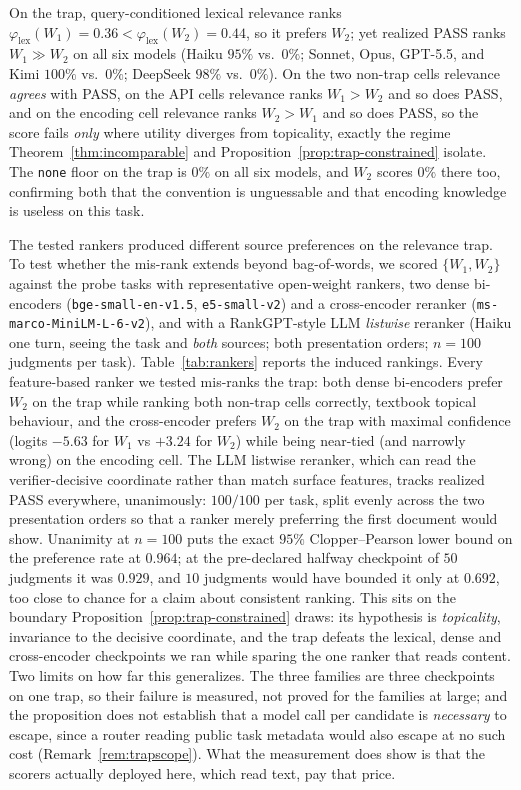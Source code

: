 \documentclass[11pt]{article}
\theoremstyle{plain}
\theoremstyle{definition}
\theoremstyle{remark}
\begin{document}
On the trap, query-conditioned lexical relevance ranks $\varphi_{\mathrm{lex}}(W_1) = 0.36 <
\varphi_{\mathrm{lex}}(W_2) = 0.44$, so it prefers $W_2$; yet realized PASS ranks $W_1 \gg W_2$ on all
six models (Haiku $95\%$ vs.\ $0\%$; Sonnet, Opus, GPT-5.5, and Kimi $100\%$ vs.\ $0\%$;
DeepSeek $98\%$ vs.\ $0\%$). On the two non-trap cells relevance \emph{agrees}
with PASS, on the API cells relevance ranks $W_1 > W_2$ and so does PASS, and on the encoding cell
relevance ranks $W_2 > W_1$ and so does PASS, so the score fails \emph{only} where utility diverges
from topicality, exactly the regime Theorem~\ref{thm:incomparable} and
Proposition~\ref{prop:trap-constrained} isolate. The \texttt{none} floor on the trap is $0\%$ on
all six models, and $W_2$ scores $0\%$ there too, confirming both that the convention is
unguessable and that encoding knowledge is useless on this task.

The tested rankers produced different source preferences on the relevance trap. To test whether
the mis-rank extends beyond bag-of-words, we scored $\{W_1,W_2\}$ against the
probe tasks with representative open-weight rankers, two dense bi-encoders
(\texttt{bge-small-en-v1.5}, \texttt{e5-small-v2}) and a cross-encoder reranker
(\texttt{ms-marco-MiniLM-L-6-v2}), and with a RankGPT-style LLM \emph{listwise} reranker (Haiku
one turn, seeing the task and \emph{both} sources; both presentation orders; $n=100$ judgments
per task). Table~\ref{tab:rankers} reports the induced rankings. Every feature-based
ranker we tested mis-ranks the trap: both dense bi-encoders prefer $W_2$ on the trap while
ranking both non-trap cells correctly, textbook topical behaviour, and the cross-encoder prefers
$W_2$ on the trap with maximal confidence (logits $-5.63$ for $W_1$ vs $+3.24$ for $W_2$) while
being near-tied (and narrowly wrong) on the encoding cell. The LLM listwise reranker,
which can read the verifier-decisive coordinate rather than match surface features, tracks
realized PASS everywhere, unanimously: $100/100$ per task, split evenly across the two
presentation orders so that a ranker merely preferring the first document would show. Unanimity
at $n=100$ puts the exact $95\%$ Clopper--Pearson lower bound on the preference rate at $0.964$;
at the pre-declared halfway checkpoint of $50$ judgments it was $0.929$, and $10$ judgments would
have bounded it only at $0.692$, too close to chance for a claim about consistent ranking. This sits on the boundary
Proposition~\ref{prop:trap-constrained} draws: its hypothesis is \emph{topicality}, invariance to
the decisive coordinate, and the trap defeats the lexical, dense and cross-encoder checkpoints we
ran while sparing the one ranker that reads content. Two limits on how far this generalizes. The
three families are three checkpoints on one trap, so their failure is measured, not proved for the
families at large; and the proposition does not establish that a model call per candidate is
\emph{necessary} to escape, since a router reading public task metadata would also escape at no
such cost (Remark~\ref{rem:trapscope}). What the measurement does show is that the scorers
actually deployed here, which read text, pay that price.
\end{document}
